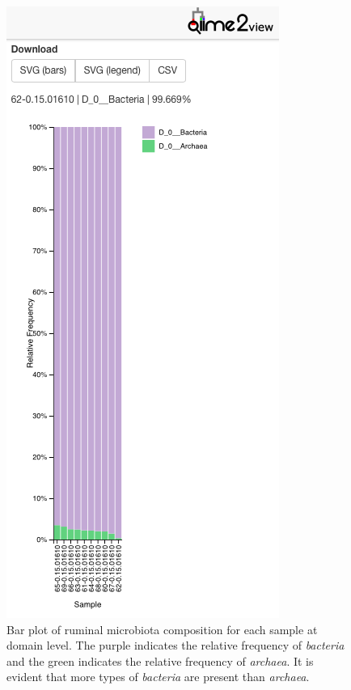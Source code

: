 \documentclass{singlecol-new}
\theoremstyle{TH}{
\newtheorem{lemma}{Lemma}
\newtheorem{theorem}[lemma]{Theorem}
\newtheorem{corrolary}[lemma]{Corrolary}
\newtheorem{conjecture}[lemma]{Conjecture}
\newtheorem{proposition}[lemma]{Proposition}
\newtheorem{claim}[lemma]{Claim}
\newtheorem{stheorem}[lemma]{Wrong Theorem}
\newtheorem{algorithm}{Algorithm}
}
\theoremstyle{THrm}{
\newtheorem{definition}{Definition}[section]
\newtheorem{question}{Question}[section]
\newtheorem{remark}{Remark}
\newtheorem{scheme}{Scheme}
}
\theoremstyle{THhit}{
\newtheorem{case}{Case}[section]
}
\begin{document}
\begin{figure}[htbp]
\centerline{\includegraphics[scale=0.45]{figures/domain-bacteria-archaea-bp.png}}
\caption{Bar plot of ruminal microbiota composition for each sample at domain level. The purple indicates the relative frequency of \textit{bacteria} and the green indicates the relative frequency of \textit{archaea}. It is evident that more types of \textit{bacteria} are present than \textit{archaea}.}
\label{fig. 3}
\end{figure}
\end{document}
